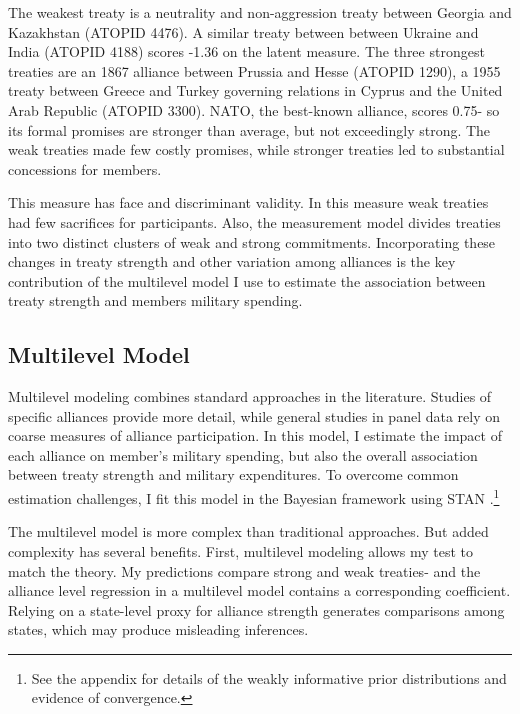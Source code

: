\documentclass[12pt]{article}
\begin{document}
The weakest treaty is a neutrality and non-aggression treaty between Georgia and Kazakhstan (ATOPID 4476).  
A similar treaty between between Ukraine and India (ATOPID 4188) scores -1.36 on the latent measure.
The three strongest treaties are an 1867 alliance between Prussia and Hesse (ATOPID 1290), a 1955 treaty between Greece and Turkey governing relations in Cyprus and the United Arab Republic (ATOPID 3300).  
NATO, the best-known alliance, scores 0.75- so its formal promises are stronger than average, but not exceedingly strong. 
The weak treaties made few costly promises, while stronger treaties led to substantial concessions for members. 


This measure has face and discriminant validity. 
In this measure weak treaties had few sacrifices for participants. 
Also, the measurement model divides treaties into two distinct clusters of weak and strong commitments. 
Incorporating these changes in treaty strength and other variation among alliances is the key contribution of the multilevel model I use to estimate the association between treaty strength and members military spending.  


\subsection{Multilevel Model} 


Multilevel modeling combines standard approaches in the literature. 
Studies of specific alliances provide more detail, while general studies in panel data rely on coarse measures of alliance participation.
In this model, I estimate the impact of each alliance on member's military spending, but also the overall association between treaty strength and military expenditures. 
To overcome common estimation challenges, I fit this model in the Bayesian framework using STAN \citep{Carpenteretal2016}.\footnote{See the appendix for details of the weakly informative prior distributions and evidence of convergence.}


The multilevel model is more complex than traditional approaches. 
But added complexity has several benefits. 
First, multilevel modeling allows my test to match the theory. 
My predictions compare strong and weak treaties- and the alliance level regression in a multilevel model contains a corresponding coefficient.
Relying on a state-level proxy for alliance strength generates comparisons among states, which may produce misleading inferences. 
\end{document}
